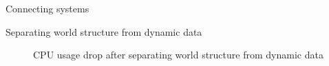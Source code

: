\documentclass{beamer}
\begin{document}
\begin{frame}{Connecting systems}
\begin{center}
\noindent{}
\end{center}
\end{frame}
\begin{frame}{Separating world structure from dynamic data}
\begin{figure}[H]
\noindent{}
\caption{CPU usage drop after separating world structure from dynamic data}
\end{figure}
\end{frame}
\end{document}
